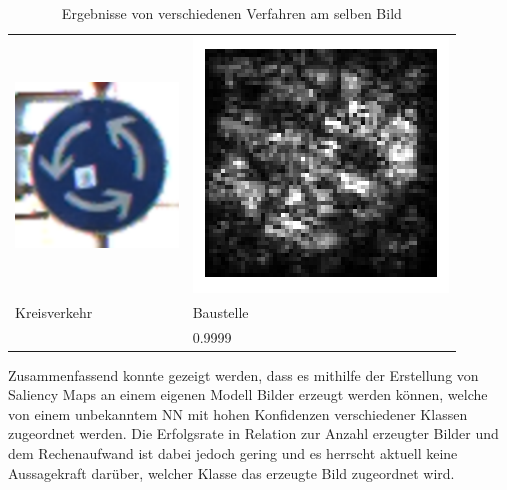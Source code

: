 \begin{table}
\begin{tabular}{p{4.4cm}p{4.4cm}}
		\includegraphics[height=4.4cm]{Images/AnPe/04709} &\includegraphics[width=\linewidth]{Images/AnPe/04709_int_grad}  \\
		Kreisverkehr &Baustelle \\
		& 0.9999
	\end{tabular}
	\caption{Ergebnisse von verschiedenen Verfahren am selben Bild }
\label{tab:sal2}
\end{table}

Zusammenfassend konnte gezeigt werden, dass es mithilfe der Erstellung von Saliency Maps an einem eigenen Modell Bilder erzeugt werden können, welche von einem unbekanntem NN mit hohen Konfidenzen verschiedener Klassen zugeordnet werden. Die Erfolgsrate in Relation zur Anzahl erzeugter Bilder und dem Rechenaufwand ist dabei jedoch gering und es herrscht aktuell keine Aussagekraft darüber, welcher Klasse das erzeugte Bild zugeordnet wird. 
